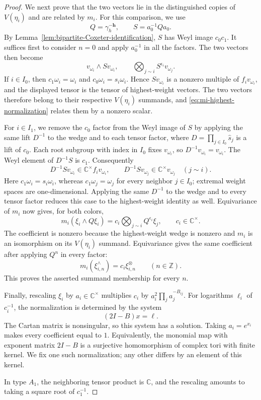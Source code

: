 \documentclass[11pt,leqno]{amsart}
\numberwithin{equation}{section}
\theoremstyle{plain}
\theoremstyle{definition}
\theoremstyle{plain}
\theoremstyle{definition}
\theoremstyle{remark}
\begin{document}
\begin{proof}
We next prove that the two vectors lie in the distinguished copies of $V(\eta_i)$ and are related by $m_i$.  For this comparison, we use
\[
 Q=\gamma_h^{-\mathbf h},\qquad S=a_0^{-1}Qa_0.
\]
By Lemma~\ref{lem:bipartite-Coxeter-identification}, $S$ has Weyl image $c_0c_1$.  It suffices first to consider $n=0$ and apply $a_0^{-1}$ in all the factors.  The two vectors then become
\[
 v_{\omega_i}\wedge Sv_{\omega_i},
 \qquad
 \bigotimes_{j\sim i}S^{\epsilon_i}v_{\omega_j}.
\]
If $i\in I_0$, then $c_1\omega_i=\omega_i$ and $c_0\omega_i=s_i\omega_i$.  Hence $Sv_{\omega_i}$ is a nonzero multiple of $f_iv_{\omega_i}$, and the displayed tensor is the tensor of highest-weight vectors.  The two vectors therefore belong to their respective $V(\eta_i)$ summands, and \eqref{eq:mi-highest-normalization} relates them by a nonzero scalar.

For $i\in I_1$, we remove the $c_0$ factor from the Weyl image of $S$ by applying the same lift $D^{-1}$ to the wedge and to each tensor factor, where $D=\prod_{j\in I_0}\widehat s_j$ is a lift of $c_0$.  Each root subgroup with index in $I_0$ fixes $v_{\omega_i}$, so $D^{-1}v_{\omega_i}=v_{\omega_i}$.  The Weyl element of $D^{-1}S$ is $c_1$.  Consequently
\[
 D^{-1}Sv_{\omega_i}\in\mathbb C^\times f_iv_{\omega_i},
 \qquad
 D^{-1}Sv_{\omega_j}\in\mathbb C^\times v_{\omega_j}
 \quad(j\sim i).
\]
Here $c_1\omega_i=s_i\omega_i$, whereas $c_1\omega_j=\omega_j$ for every neighbor $j\in I_0$; extremal weight spaces are one-dimensional.  Applying the same $D^{-1}$ to the wedge and to every tensor factor reduces this case to the highest-weight identity as well.  Equivariance of $m_i$ now gives, for both colors,
\[
 m_i(\xi_i\wedge Q\xi_i)
 =c_i\bigotimes_{j\sim i}Q^{\epsilon_i}\xi_j,
 \qquad c_i\in\mathbb C^\times.
\]
The coefficient is nonzero because the highest-weight wedge is nonzero and $m_i$ is an isomorphism on its $V(\eta_i)$ summand.  Equivariance gives the same coefficient after applying $Q^n$ in every factor:
\[
 m_i(\xi_{i,n}^{\wedge})=c_i\xi_{i,n}^{\otimes}
 \qquad(n\in\mathbb Z).
\]
This proves the asserted summand membership for every $n$.

Finally, rescaling $\xi_i$ by $a_i\in\mathbb C^\times$ multiplies $c_i$ by $a_i^2\prod_j a_j^{-B_{ij}}$.  For logarithms $\ell_i$ of $c_i^{-1}$, the normalization is determined by the system
\[
 (2I-B)x=\ell.
\]
The Cartan matrix is nonsingular, so this system has a solution.  Taking $a_i=e^{x_i}$ makes every coefficient equal to $1$.  Equivalently, the monomial map with exponent matrix $2I-B$ is a surjective homomorphism of complex tori with finite kernel.  We fix one such normalization; any other differs by an element of this kernel.

In type $A_1$, the neighboring tensor product is $\mathbb C$, and the rescaling amounts to taking a square root of $c_1^{-1}$.
\end{proof}
\end{document}
